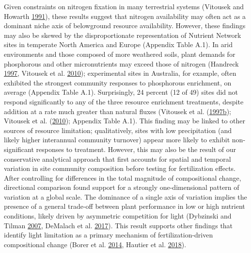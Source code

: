\documentclass[twoside,12pt,final]{ucthesis-CA2012}
\begin{document}
\begin{ucmainmatter}
Given constraints on nitrogen fixation in many terrestrial systems (Vitousek and Howarth \protect\hyperlink{ref-Vitousek1991}{1991}), these results suggest that nitrogen availability may often act as a dominant niche axis of belowground resource availability. However, these findings may also be skewed by the disproportionate representation of Nutrient Network sites in temperate North America and Europe (Appendix Table A.1). In arid environments and those composed of more weathered soils, plant demands for phosphorous and other micronutrients may exceed those of nitrogen (Handreck \protect\hyperlink{ref-Handreck1997}{1997}, Vitousek et al. \protect\hyperlink{ref-Vitousek2010}{2010}); experimental sites in Australia, for example, often exhibited the strongest community responses to phosphorous enrichment, on average (Appendix Table A.1).
Surprisingly, 24 percent (12 of 49) sites did not respond significantly to any of the three resource enrichment treatments, despite addition at a rate much greater than natural fluxes (Vitousek et al. (\protect\hyperlink{ref-Vitousek1997}{1997}\protect\hyperlink{ref-Vitousek1997}{b}); Vitousek et al. (\protect\hyperlink{ref-Vitousek2010}{2010}); Appendix Table A.1). This finding may be linked to other sources of resource limitation; qualitatively, sites with low precipitation (and likely higher interannual community turnover) appear more likely to exhibit non-significant responses to treatment. However, this may also be the result of our conservative analytical approach that first accounts for spatial and temporal variation in site community composition before testing for fertilization effects.
After controlling for differences in the total magnitude of compositional change, directional comparison found support for a strongly one-dimensional pattern of variation at a global scale. The dominance of a single axis of variation implies the presence of a general trade-off between plant performance in low or high nutrient conditions, likely driven by asymmetric competition for light (Dybzinski and Tilman \protect\hyperlink{ref-Dybzinski2007a}{2007}, DeMalach et al. \protect\hyperlink{ref-DeMalach2017a}{2017}). This result supports other findings that identify light limitation as a primary mechanism of fertilization-driven compositional change (Borer et al. \protect\hyperlink{ref-Borer2014a}{2014}, Hautier et al. \protect\hyperlink{ref-Hautier2018}{2018}).


\end{ucmainmatter}
\end{document}
